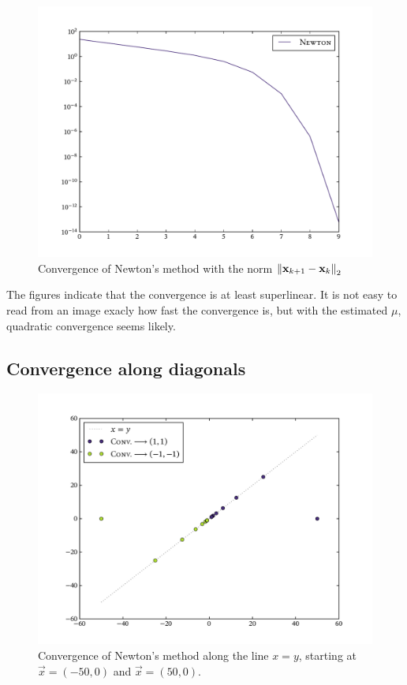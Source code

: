 \documentclass[12pt]{article}
\begin{document}
\begin{multicols}{2}
    \begin{figure}[H]
        \centering
        \includegraphics[width=0.75\columnwidth]{diff_norms}
        \caption{
            Convergence of Newton's method with the norm
            $\Norm[2]{\vec x_{k+1} - \vec x_k }$
        }
        \label{fig:diff_norms}
    \end{figure}\noindent
    The figures indicate that the convergence is at least superlinear.
    It is not easy to read from an image exacly how fast the convergence is,
    but with the estimated $\mu$, quadratic convergence seems likely.

    \subsection*{Convergence along diagonals}
    \begin{figure}[H]
        \centering
        \includegraphics[width=\columnwidth]{conv_pn}
        \caption{
            Convergence of Newton's method along the line $x = y$,
            starting at $\vec x = (-50, 0)$ and $\vec x = (50, 0)$.
        }
        \label{fig:diff_norms}
    \end{figure}\noindent


\end{multicols}
\end{document}
